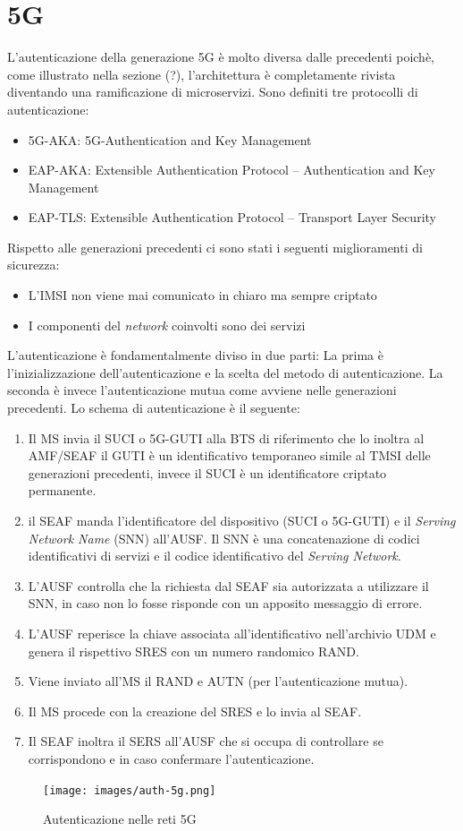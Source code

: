 \clearpage

\section{5G}
L'autenticazione della generazione 5G è molto diversa dalle precedenti poichè, come illustrato nella sezione (?), l'architettura è completamente rivista diventando una ramificazione di microservizi.
Sono definiti tre protocolli di autenticazione:
\begin{itemize}
    \item 5G-AKA: 5G-Authentication and Key Management
    \item EAP-AKA: Extensible Authentication Protocol – Authentication and Key Management
    \item EAP-TLS: Extensible Authentication Protocol – Transport Layer Security
\end{itemize}
Rispetto alle generazioni precedenti ci sono stati i seguenti miglioramenti di sicurezza\cite{5g-vs-4g}:
\begin{itemize}
    \item L'IMSI non viene mai comunicato in chiaro ma sempre criptato
    \item I componenti del \textit{network} coinvolti sono dei servizi
\end{itemize}
L'autenticazione è fondamentalmente diviso in due parti: La prima è l'inizializzazione dell'autenticazione e la scelta del metodo di autenticazione.
La seconda è invece l'autenticazione mutua come avviene nelle generazioni precedenti.
Lo schema di autenticazione è il seguente\cite{5g-auth}:
\begin{enumerate}
    \item Il MS invia il SUCI o 5G-GUTI alla BTS di riferimento che lo inoltra al AMF/SEAF
    il GUTI è un identificativo temporaneo simile al TMSI delle generazioni precedenti, invece il SUCI è un identificatore criptato
    permanente.
    \item il SEAF manda l'identificatore del dispositivo (SUCI o 5G-GUTI) e il \textit{Serving Network Name} (SNN) all'AUSF.
    Il SNN è una concatenazione di codici identificativi di servizi e il codice identificativo del \textit{Serving Network}.
    \item L'AUSF controlla che la richiesta dal SEAF sia autorizzata a utilizzare il SNN, in caso non lo fosse risponde con un 
    apposito messaggio di errore.
    \item L'AUSF reperisce la chiave associata all'identificativo nell'archivio UDM e genera il rispettivo SRES con un numero randomico RAND.
    \item Viene inviato all'MS il RAND e AUTN (per l'autenticazione mutua).
    \item Il MS procede con la creazione del SRES e lo invia al SEAF.
    \item Il SEAF inoltra il SERS all'AUSF che si occupa di controllare se corrispondono e in caso confermare l'autenticazione.
\end{enumerate}
\begin{figure}[h]
    \centering
    \texttt{[image: images/auth-5g.png]}
    \caption{Autenticazione nelle reti 5G}
\end{figure}